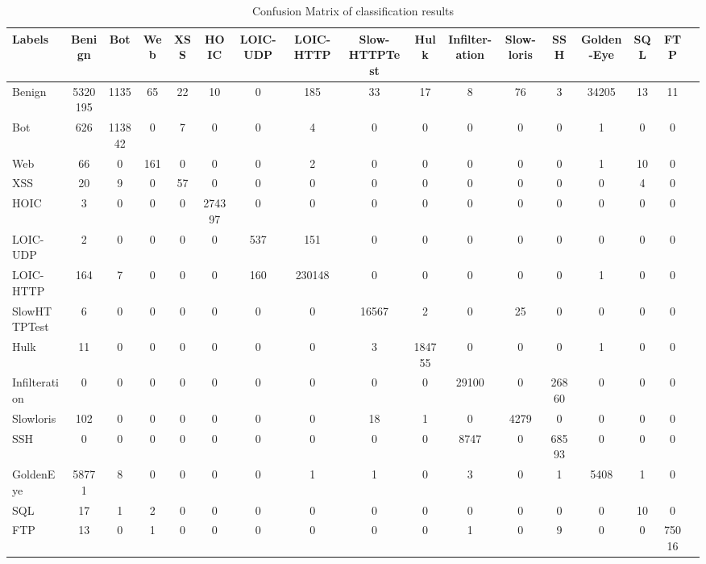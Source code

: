 \documentclass{ieeeaccess}
\theoremstyle{definition}
\begin{document}
\begin{table}
    \centering
    \begin{threeparttable}[b]
        \caption{Confusion Matrix of classification results}
        \label{tab:confusion-matrix}
        \begin{tabularx}{\textwidth}{@{}l*{15}{C}c@{}}
            \toprule
            Labels & Benign & Bot & Web & XSS & HOIC & LOIC-UDP & LOIC-HTTP & Slow-HTTPTest & Hulk & Infilter-ation & Slow-loris & SSH & Golden-Eye & SQL & FTP \\
            \midrule
            Benign & 5320195 & 1135 & 65 & 22 & 10 & 0 & 185 & 33 & 17 & 8 & 76 & 3 & 34205 & 13 & 11 \\
            Bot & 626 & 113842 & 0 & 7 & 0 & 0 & 4 & 0 & 0 & 0 & 0 & 0 & 1 & 0 & 0 \\
            Web & 66 & 0 & 161 & 0 & 0 & 0 & 2 & 0 & 0 & 0 & 0 & 0 & 1 &  10 & 0 \\
            XSS & 20 & 9 & 0 & 57 & 0 & 0 & 0 & 0 & 0 & 0 & 0 & 0 & 0 &  4 & 0 \\
            HOIC & 3 & 0 & 0 & 0 & 274397 & 0 & 0 & 0 & 0 & 0 & 0 & 0 & 0 & 0 & 0 \\
            LOIC-UDP & 2 & 0 & 0 & 0 & 0 & 537 & 151 & 0 & 0 & 0 & 0 & 0 & 0 & 0 & 0 \\
            LOIC-HTTP & 164 & 7 & 0 & 0 & 0 & 160 & 230148 & 0 & 0 & 0 & 0 & 0 & 1 & 0 & 0 \\
            SlowHTTPTest & 6 & 0 & 0 & 0 & 0 & 0 & 0 & 16567 & 2 & 0 & 25 & 0 & 0 & 0 & 0 \\
            Hulk & 11 & 0 & 0 & 0 & 0 & 0 & 0 & 3 & 184755 & 0 & 0 & 0 & 1 & 0 & 0 \\
            Infilteration & 0 & 0 & 0 & 0 & 0 & 0 & 0 & 0 & 0 & 29100 & 0 & 26860 & 0 & 0 & 0 \\
            Slowloris & 102 & 0 & 0 & 0 & 0 & 0 & 0 & 18 & 1 & 0 & 4279 & 0 & 0 & 0 & 0 \\
            SSH & 0 & 0 & 0 & 0 & 0 & 0 & 0 & 0 & 0 & 8747 & 0 & 68593 & 0 & 0 & 0 \\
            GoldenEye & 58771 & 8 & 0 & 0 & 0 & 0 & 1 & 1 & 0 & 3 & 0 & 1 & 5408 & 1 & 0 \\
            SQL & 17 & 1 & 2 & 0 & 0 & 0 & 0 & 0 & 0 & 0 & 0 & 0 & 0 & 10 & 0 \\
            FTP & 13 & 0 & 1 & 0 & 0 & 0 & 0 & 0 & 0 & 1 & 0 & 9 & 0 & 0 & 75016 \\

\end{tabularx}
\end{threeparttable}
\end{table}
\end{document}
